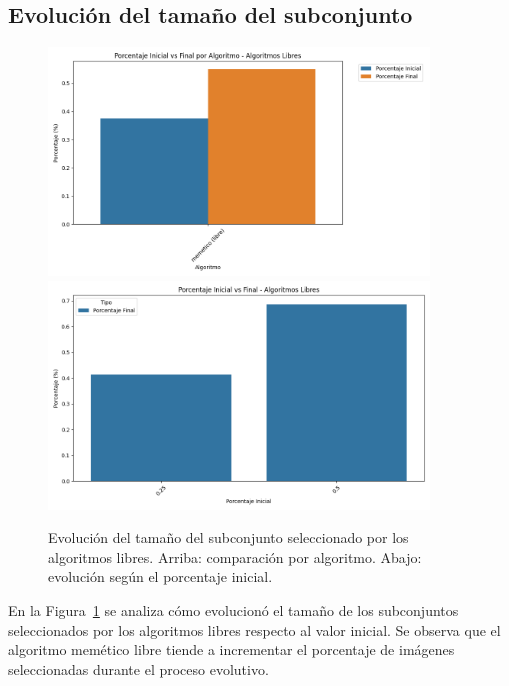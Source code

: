 \subsection{Evolución del tamaño del subconjunto}
\begin{figure}[htp]
    \centering
    \includegraphics[width=0.9\textwidth]{imagenes/evaluaciones/painting/porcentaje-inical-vs-final-por-algoritmo}
    \vspace{1em}
    \includegraphics[width=0.9\textwidth]{imagenes/evaluaciones/painting/porcentaje-inicial-vs-final-por-pi}
    \caption{Evolución del tamaño del subconjunto seleccionado por los algoritmos libres.
        Arriba: comparación por algoritmo.
        Abajo: evolución según el porcentaje inicial.
    }
    \label{fig:evolucion_porcentaje_libre}
\end{figure}

En la Figura~\ref{fig:evolucion_porcentaje_libre} se analiza cómo evolucionó el tamaño de los subconjuntos seleccionados por los algoritmos libres respecto al valor inicial.
Se observa que el algoritmo memético libre tiende a incrementar el porcentaje de imágenes seleccionadas durante el proceso evolutivo.

